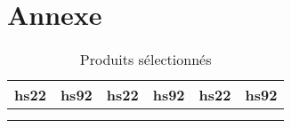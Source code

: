 \documentclass[french,10pt,a4paper]{article}
\begin{document}
\newpage
\section{Annexe}

\begin{longtable}{|ll|ll|ll|}
  hs22 & hs92 & hs22 & hs92 & hs22 & hs92 \\
  \hline 
  \\
  \hline 
  \caption{Produits sélectionnés}
  \label{tab:table-products-init}
 \end{longtable}


 
\newpage


\end{document}
